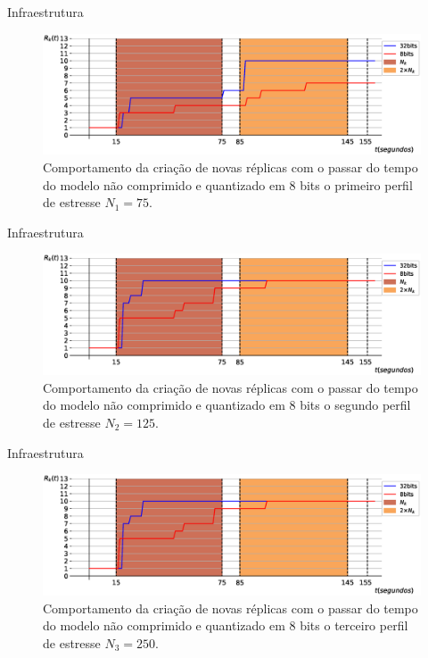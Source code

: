 \begin{frame}{Infraestrutura}
    \begin{figure}[H]
    \centering
    \includegraphics[width=1\textwidth]{figuras/escalonamento.eps}
    \caption{Comportamento da criação de novas réplicas com o passar do tempo do modelo não comprimido e quantizado em $8$ bits o primeiro perfil de estresse $N_1=75$.}
    \end{figure}
\end{frame}

\begin{frame}{Infraestrutura}
    \begin{figure}[H]
    \centering
    \includegraphics[width=1\textwidth]{figuras/escalonamento2.eps}
    \caption{Comportamento da criação de novas réplicas com o passar do tempo do modelo não comprimido e quantizado em $8$ bits o segundo perfil de estresse $N_2=125$.}
    \end{figure}
\end{frame}

\begin{frame}{Infraestrutura}
    \begin{figure}[H]
    \centering
    \includegraphics[width=1\textwidth]{figuras/escalonamento2.eps}
    \caption{Comportamento da criação de novas réplicas com o passar do tempo do modelo não comprimido e quantizado em $8$ bits o terceiro perfil de estresse $N_3=250$.}
    \end{figure}
\end{frame}